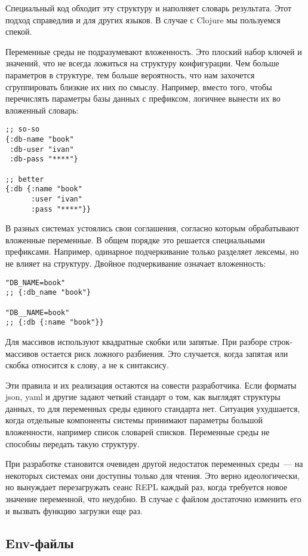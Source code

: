 Специальный код обходит эту структуру и наполняет словарь результата. Этот
подход справедлив и для других языков. В случае с Clojure мы пользуемся спекой.

Переменные среды не подразумевают вложенность. Это плоский набор ключей и
значений, что не всегда ложиться на структуру конфигурации. Чем больше
параметров в структуре, тем больше вероятность, что нам захочется сгруппировать
близкие их них по смыслу. Например, вместо того, чтобы перечислять параметры
базы данных с префиксом, логичнее вынести их во вложенный словарь:

\begin{verbatim}
;; so-so
{:db-name "book"
 :db-user "ivan"
 :db-pass "****"}

;; better
{:db {:name "book"
      :user "ivan"
      :pass "****"}}
\end{verbatim}

В разных системах устоялись свои соглашения, согласно которым обрабатывают
вложенные переменные. В общем порядке это решается специальными
префиксами. Например, одинарное подчеркивание только разделяет лексемы, но не
влияет на структуру. Двойное подчеркивание означает вложенность:

\begin{verbatim}
"DB_NAME=book"
;; {:db_name "book"}

"DB__NAME=book"
;; {:db {:name "book"}}
\end{verbatim}

Для массивов используют квадратные скобки или запятые. При разборе
строк-массивов остается риск ложного разбиения. Это случается, когда запятая или
скобка относится к слову, а не к синтаксису.

Эти правила и их реализация остаются на совести разработчика. Если форматы json,
yaml и другие задают четкий стандарт о том, как выглядят структуры данных, то
для переменных среды единого стандарта нет. Ситуация ухудшается, когда отдельные
компоненты системы принимают параметры большой вложенности, например список
словарей списков. Переменные среды не способны передать такую структуру.

При разработке становится очевиден другой недостаток переменных среды~--- на
некоторых системах они доступны только для чтения. Это верно идеологически, но
вынуждает перезагружать сеанс REPL каждый раз, когда требуется новое значение
переменной, что неудобно. В случае с файлом достаточно изменить его и вызвать
функцию загрузки еще раз.

\subsection{Env-файлы}

